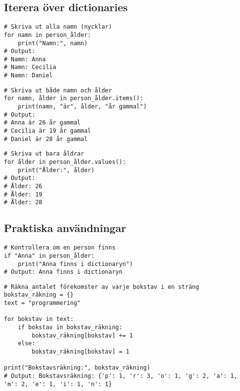 \subsection*{Iterera över dictionaries}

\begin{lstlisting}[title=Exempel 6: Iterera över nycklar]
# Skriva ut alla namn (nycklar)
for namn in person_ålder:
    print("Namn:", namn)
# Output:
# Namn: Anna
# Namn: Cecilia
# Namn: Daniel
\end{lstlisting}

\begin{lstlisting}[title=Exempel 7: Iterera över nycklar och värden]
# Skriva ut både namn och ålder
for namn, ålder in person_ålder.items():
    print(namn, "är", ålder, "år gammal")
# Output:
# Anna är 26 år gammal
# Cecilia är 19 år gammal
# Daniel är 28 år gammal
\end{lstlisting}

\begin{lstlisting}[title=Exempel 8: Iterera över värden]
# Skriva ut bara åldrar
for ålder in person_ålder.values():
    print("Ålder:", ålder)
# Output:
# Ålder: 26
# Ålder: 19
# Ålder: 28
\end{lstlisting}

\subsection*{Praktiska användningar}

\begin{lstlisting}[title=Exempel 9: Kontrollera om en nyckel finns]
# Kontrollera om en person finns
if "Anna" in person_ålder:
    print("Anna finns i dictionaryn")
# Output: Anna finns i dictionaryn
\end{lstlisting}

\begin{lstlisting}[title=Exempel 10: Räkna förekomster med en dictionary]
# Räkna antalet förekomster av varje bokstav i en sträng
bokstav_räkning = {}
text = "programmering"

for bokstav in text:
    if bokstav in bokstav_räkning:
        bokstav_räkning[bokstav] += 1
    else:
        bokstav_räkning[bokstav] = 1

print("Bokstavsräkning:", bokstav_räkning)
# Output: Bokstavsräkning: {'p': 1, 'r': 3, 'o': 1, 'g': 2, 'a': 1, 'm': 2, 'e': 1, 'i': 1, 'n': 1}
\end{lstlisting}
